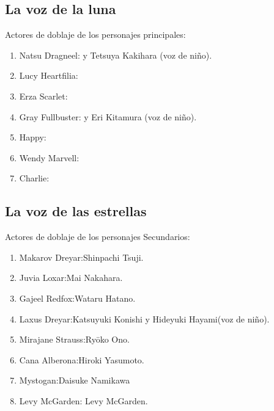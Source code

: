 \documentclass[a5paper,11pt]{article}
\begin{document}
\subsection{La voz de la luna}
Actores de doblaje de los personajes principales:
\begin{enumerate}
    \item Natsu Dragneel:  y Tetsuya Kakihara (voz de niño).
    \item Lucy Heartfilia:
    \item Erza Scarlet:
    \item Gray Fullbuster:  y Eri Kitamura (voz de niño).
    \item Happy:
    \item Wendy Marvell:  
    \item Charlie:	
\end{enumerate}
\subsection{La voz de las estrellas}
Actores de doblaje de los personajes Secundarios:
\begin{enumerate}
    \item Makarov Dreyar:Shinpachi Tsuji.
    \item Juvia Loxar:Mai Nakahara.
    \item Gajeel Redfox:Wataru Hatano.
    \item Laxus Dreyar:Katsuyuki Konishi y Hideyuki Hayami(voz de niño).
    \item Mirajane Strauss:Ryōko Ono.
    \item Cana Alberona:Hiroki Yasumoto.
    \item Mystogan:Daisuke Namikawa
    \item Levy McGarden: Levy McGarden.
\end{enumerate}
\end{document}
